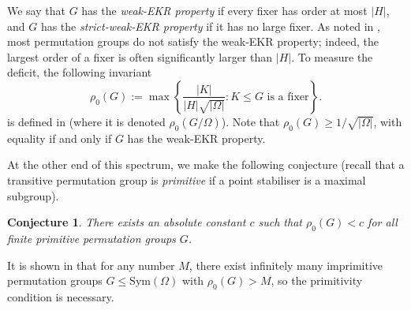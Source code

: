 \documentclass[twoside,a4paper,reqno,11pt]{amsart}
\newcommand{\<}{\langle}
\renewcommand{\>}{\rangle}
\newcommand{\leqs}{\leqslant}
\newcommand{\geqs}{\geqslant}
\newtheorem{conj}[theorem]{Conjecture}
\theoremstyle{definition}
\newtheorem*{definition}{Definition}
\begin{document}
	We say that $G$ has the \textit{weak-EKR property} if every fixer has order at most $|H|$, and $G$ has the \textit{strict-weak-EKR property} if it has no large fixer. As noted in \cite{LPSX_intersecting}, most permutation groups do not satisfy the weak-EKR property; indeed, the largest order of a fixer is often significantly larger than $|H|$.
	To measure the deficit,
	the following invariant
	\begin{equation*}
	\rho_0(G) := \max\left\{\frac{|K|}{|H|\sqrt{|\Omega|}}:\mbox{$K \leqs G$ is a fixer}\right\}.
	\end{equation*}
	is defined in \cite{LPSX_intersecting} (where it is denoted $\rho_0(G/\Omega)$). Note that $\rho_0(G)\geqs 1/\sqrt{|\Omega|}$, with equality if and only if $G$ has the weak-EKR property. 
	
	At the other end of this spectrum, we make the following conjecture (recall that a transitive permutation group is \textit{primitive} if a point stabiliser is a maximal subgroup).
	
	\begin{conj}
		\label{conj:rho_0}
		There exists an absolute constant $c$ such that $\rho_0(G) < c$ for all finite primitive permutation groups $G$.
	\end{conj}
	
	It is shown in \cite[Theorem 1.6]{LPSX_intersecting} that for any number $M$, there exist infinitely many imprimitive permutation groups $G\leqs\mathrm{Sym}(\Omega)$ with $\rho_0(G) > M$, so the primitivity condition is necessary. 
	
\end{document}
